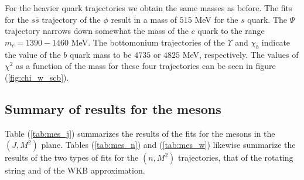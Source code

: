 \documentclass[11pt,a4]{article}
\newcommand{\ssb}{s\bar{s}}
\begin{document}
For the heavier quark trajectories we obtain the same masses as before. The fits for the \(\ssb\) trajectory of the \(\phi\) result in a mass of \(515\) MeV for the \(s\) quark. The \(\Psi\) trajectory narrows down somewhat the mass of the \(c\) quark to the range \(m_c = 1390-1460\) MeV. The bottomonium trajectories of the \(\Upsilon\) and \(\chi_b\)	 indicate the value of the \(b\) quark mass to be \(4735\) or \(4825\) MeV, respectively. The values of \(\chi^2\) as a function of the mass for these four trajectories can be seen in figure (\ref{fig:chi_w_scb}).
		
\subsection{Summary of results for the mesons}

Table (\ref{tab:mes_j}) summarizes the results of the fits for the mesons in the \((J,M^2)\) plane. Tables (\ref{tab:mes_n}) and (\ref{tab:mes_w}) likewise summarize the results of the two types of fits for the \((n,M^2)\) trajectories, that of the rotating string and of the WKB approximation.
\end{document}
